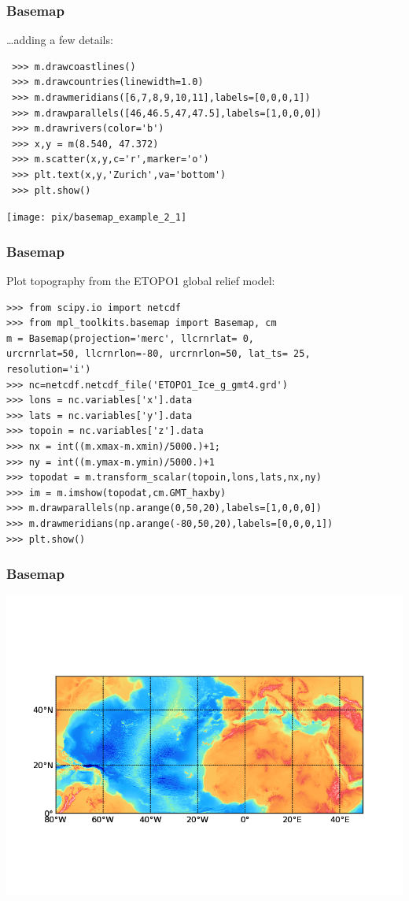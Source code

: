 \begin{frame}[fragile]
\frametitle{Basemap}
\ldots adding a few details:
\begin{myColorBox}{1.0}{}
\begin{verbatim}
 >>> m.drawcoastlines()
 >>> m.drawcountries(linewidth=1.0)
 >>> m.drawmeridians([6,7,8,9,10,11],labels=[0,0,0,1])
 >>> m.drawparallels([46,46.5,47,47.5],labels=[1,0,0,0])
 >>> m.drawrivers(color='b')
 >>> x,y = m(8.540, 47.372)
 >>> m.scatter(x,y,c='r',marker='o')
 >>> plt.text(x,y,'Zurich',va='bottom')
 >>> plt.show()
\end{verbatim}
\end{myColorBox}
\pause
\begin{center}
      \texttt{[image: pix/basemap\_example\_2\_1]}
\end{center}
\end{frame}

\begin{frame}[fragile]
\frametitle{Basemap}
Plot topography from the ETOPO1 global relief model:
\begin{myColorBox}{1.0}{}
\begin{verbatim}
>>> from scipy.io import netcdf
>>> from mpl_toolkits.basemap import Basemap, cm
m = Basemap(projection='merc', llcrnrlat= 0, 
urcrnrlat=50, llcrnrlon=-80, urcrnrlon=50, lat_ts= 25, 
resolution='i')
>>> nc=netcdf.netcdf_file('ETOPO1_Ice_g_gmt4.grd')
>>> lons = nc.variables['x'].data
>>> lats = nc.variables['y'].data
>>> topoin = nc.variables['z'].data
>>> nx = int((m.xmax-m.xmin)/5000.)+1; 
>>> ny = int((m.ymax-m.ymin)/5000.)+1
>>> topodat = m.transform_scalar(topoin,lons,lats,nx,ny)
>>> im = m.imshow(topodat,cm.GMT_haxby)
>>> m.drawparallels(np.arange(0,50,20),labels=[1,0,0,0])
>>> m.drawmeridians(np.arange(-80,50,20),labels=[0,0,0,1])
>>> plt.show()
\end{verbatim}
\end{myColorBox}
\end{frame}

\begin{frame}[fragile]
\frametitle{Basemap}
\begin{center}
      \includegraphics[width=1.0\textwidth]{pix/basemap_example_3}
\end{center}
\end{frame}

